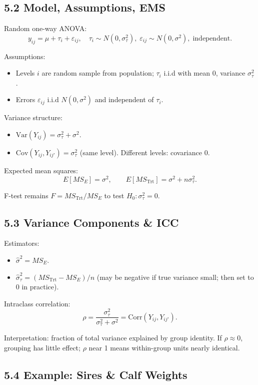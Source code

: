 \documentclass[9pt,letterpaper]{article}
\begin{document}
\subsection{5.2 Model, Assumptions, EMS}

Random one-way ANOVA:
\[
y_{ij}=\mu+\tau_i+\varepsilon_{ij},\quad \tau_i\sim N(0,\sigma_\tau^2),\; \varepsilon_{ij}\sim N(0,\sigma^2),\; \text{independent}.
\]

Assumptions:
\begin{itemize}
    \item Levels $i$ are random sample from population; $\tau_i$ i.i.d with mean 0, variance $\sigma_\tau^2$.
    \item Errors $\varepsilon_{ij}$ i.i.d $N(0,\sigma^2)$ and independent of $\tau_i$.
\end{itemize}

Variance structure:
\begin{itemize}
    \item $\text{Var}(Y_{ij})=\sigma_\tau^2+\sigma^2$.
    \item $\text{Cov}(Y_{ij},Y_{ij'})=\sigma_\tau^2$ (same level). Different levels: covariance 0.
\end{itemize}

Expected mean squares:
\[
E[MS_E]=\sigma^2,\qquad E[MS_{\text{Trt}}]=\sigma^2+n\sigma_\tau^2.
\]

F-test remains $F=MS_{\text{Trt}}/MS_E$ to test $H_0:\sigma_\tau^2=0$.

\subsection{5.3 Variance Components \& ICC}

Estimators:
\begin{itemize}
    \item $\hat{\sigma}^2=MS_E$.
    \item $\hat{\sigma}_\tau^2=(MS_{\text{Trt}}-MS_E)/n$ (may be negative if true variance small; then set to 0 in practice).
\end{itemize}

Intraclass correlation:
\[
\rho=\frac{\sigma_\tau^2}{\sigma_\tau^2+\sigma^2}=\text{Corr}(Y_{ij},Y_{ij'}).
\]

Interpretation: fraction of total variance explained by group identity. If $\rho\approx0$, grouping has little effect; $\rho$ near 1 means within-group units nearly identical.

\subsection{5.4 Example: Sires \& Calf Weights}
\end{document}
